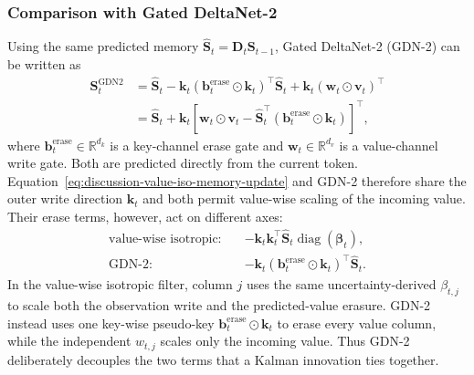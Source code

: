 \documentclass[11pt]{article}
\newcommand{\vct}[1]{\boldsymbol{#1}}
\newcommand{\diag}{\operatorname{diag}}
\begin{document}
\subsubsection{Comparison with Gated DeltaNet-2}
\label{subsubsec:discussion-value-iso-gdn2}

Using the same predicted memory
$\widehat{\vct{S}}_t=\vct{D}_t\vct{S}_{t-1}$, Gated DeltaNet-2 (GDN-2) can be written as
\begin{equation}
\begin{aligned}
  \vct{S}_t^{\mathrm{GDN2}}
  &=\widehat{\vct{S}}_t
    -\vct{k}_t
      (\vct{b}_t^{\mathrm{erase}}\odot\vct{k}_t)^\top
      \widehat{\vct{S}}_t
    +\vct{k}_t(\vct{w}_t\odot\vct{v}_t)^\top
  \\
  &=\widehat{\vct{S}}_t
    +\vct{k}_t\left[
      \vct{w}_t\odot\vct{v}_t
      -\widehat{\vct{S}}_t^\top
       (\vct{b}_t^{\mathrm{erase}}\odot\vct{k}_t)
    \right]^\top,
\end{aligned}
  \label{eq:discussion-gdn2-comparison-update}
\end{equation}
where $\vct{b}_t^{\mathrm{erase}}\in\mathbb{R}^{d_k}$ is a key-channel erase gate and
$\vct{w}_t\in\mathbb{R}^{d_v}$ is a value-channel write gate. Both are predicted directly from
the current token. Equation~\eqref{eq:discussion-value-iso-memory-update} and GDN-2 therefore share
the outer write direction $\vct{k}_t$ and both permit value-wise scaling of the incoming value.
Their erase terms, however, act on different axes:
\begin{equation}
\begin{aligned}
  \text{value-wise isotropic:}\quad
  &-\vct{k}_t\vct{k}_t^\top
    \widehat{\vct{S}}_t\diag(\vct{\beta}_t),
  \\
  \text{GDN-2:}\quad
  &-\vct{k}_t
    (\vct{b}_t^{\mathrm{erase}}\odot\vct{k}_t)^\top
    \widehat{\vct{S}}_t.
\end{aligned}
  \label{eq:discussion-value-iso-gdn2-erase-comparison}
\end{equation}
In the value-wise isotropic filter, column $j$ uses the same uncertainty-derived
$\beta_{t,j}$ to scale both the observation write and the predicted-value erasure. GDN-2 instead
uses one key-wise pseudo-key
$\vct{b}_t^{\mathrm{erase}}\odot\vct{k}_t$ to erase every value column, while the independent
$w_{t,j}$ scales only the incoming value. Thus GDN-2 deliberately decouples the two terms that a
Kalman innovation ties together.
\end{document}
